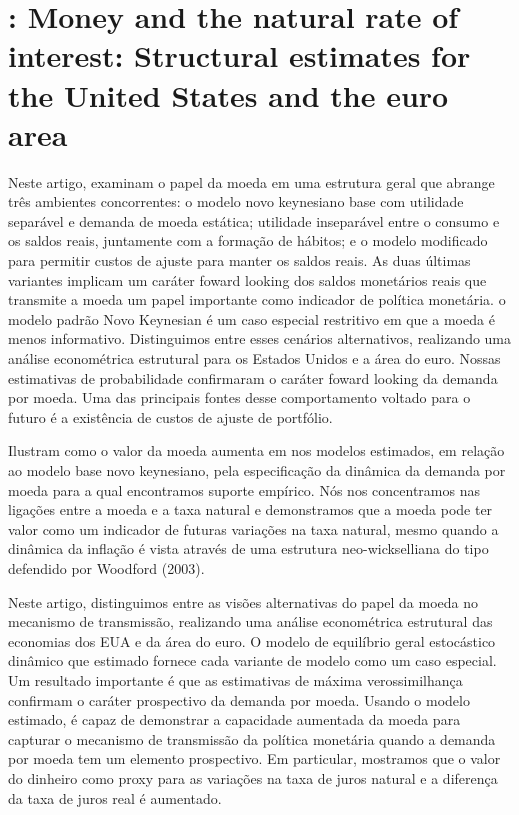\section{\citet{Lopez-Salido:2009}: Money and the natural rate of interest: Structural estimates for the United States and the euro area }

Neste artigo, examinam o papel da moeda em uma estrutura geral que abrange três ambientes concorrentes: o modelo novo keynesiano  base com utilidade separável e demanda de moeda estática; utilidade inseparável entre o consumo e os saldos reais, juntamente com a formação de hábitos; e o modelo modificado para permitir custos de ajuste para manter os saldos reais. As duas últimas variantes implicam um caráter foward looking dos saldos monetários reais que transmite a moeda um papel importante como indicador de política monetária. o modelo padrão Novo Keynesian é um caso especial restritivo em que a moeda é menos informativo. Distinguimos entre esses cenários alternativos, realizando uma análise econométrica estrutural para os Estados Unidos e a área do euro. Nossas estimativas de probabilidade confirmaram o caráter foward looking da demanda por moeda. Uma das principais fontes desse comportamento voltado para o futuro é a existência de custos de ajuste de portfólio.

Ilustram como o valor da moeda aumenta em nos modelos estimados, em relação ao modelo base novo keynesiano, pela especificação da dinâmica da demanda por moeda para a qual encontramos suporte empírico. Nós nos concentramos nas ligações entre a moeda e a taxa natural e demonstramos que a moeda pode ter valor como um indicador de futuras variações na taxa natural, mesmo quando a dinâmica da inflação é vista através de uma estrutura neo-wickselliana do tipo defendido por Woodford (2003).

Neste artigo, distinguimos entre as visões alternativas do papel da moeda no mecanismo de transmissão, realizando uma análise econométrica estrutural das economias dos EUA e da área do euro. O modelo de equilíbrio geral estocástico dinâmico que estimado fornece cada variante de modelo  como um caso especial. Um resultado importante é que as estimativas de máxima verossimilhança confirmam o caráter prospectivo da demanda por moeda. Usando o modelo estimado, é capaz de demonstrar a capacidade aumentada da moeda para capturar o mecanismo de transmissão da política monetária quando a demanda por moeda tem um elemento prospectivo. Em particular, mostramos que o valor do dinheiro como proxy para as variações na taxa de juros natural e a diferença da taxa de juros real é aumentado.

